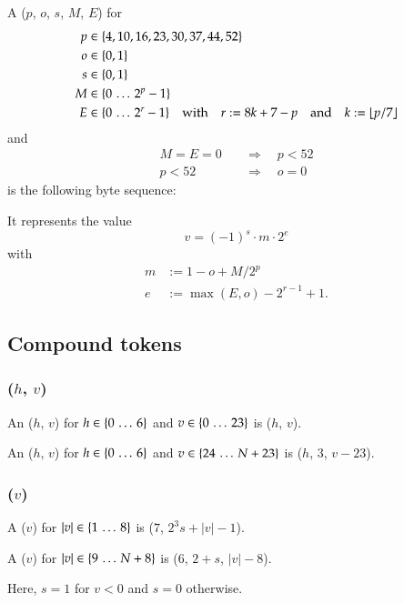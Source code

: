A \DborBinaryRationalToken($p$, $o$, $s$, $M$, $E$) for
\begin{align*}
    p & \in \{4, 10, 16, 23, 30, 37, 44, 52\} \\
    o & \in \{0, 1\} \\
    s & \in \{0, 1\} \\
    M & \in \{0 \,\ldots\, 2^p - 1\} \\
    E & \in \{0 \,\ldots\, 2^r - 1\}
        \quad\text{with}\quad r := 8 k + 7 - p
        \quad\text{and}\quad k := \lfloor p / 7 \rfloor
\end{align*}%
and
\begin{align*}
    M = E = 0 \quad & \Rightarrow \quad p < 52 \\
    p < 52 \quad & \Rightarrow \quad o = 0
\end{align*}%
is the following byte sequence:


It represents the value
\begin{equation}
    v = (-1)^s \cdot m \cdot 2^e
\end{equation}
with
\begin{align*}
    m & := 1 - o + M / 2^p \\
    e & := \max(E, o) - 2^{r-1} + 1.
\end{align*}


\subsection{Compound tokens}

\subsubsection{\DborIntegerToken(\texorpdfstring{$h$, $v$}{h, v})}
\hypertarget{sec:def:IntegerToken}{}

An \DborIntegerToken($h$, $v$) for $h \in \{0 \,\ldots\, 6\}$ and
$v \in \{0 \,\ldots\, 23\}$ is \DborMinimalToken($h$, $v$).

An \DborIntegerToken($h$, $v$) for $h \in \{0 \,\ldots\, 6\}$ and
$v \in \{24 \,\ldots\, N + 23\}$
is \DborNaturalToken($h$, $3$, $v - 23$).


\subsubsection{\DborPowerOfTenToken(\texorpdfstring{$v$}{v})}
\hypertarget{sec:def:PowerOfTenToken}{}

A \DborPowerOfTenToken($v$) for $|v| \in \{1 \,\ldots\, 8\}$ is
\DborMinimalToken($7$, $2^3 s + |v| - 1$).

A \DborPowerOfTenToken($v$) for $|v| \in \{9 \,\ldots\, N + 8\}$ is
\DborNaturalToken($6$, $2 + s$, $|v| - 8$).

Here, $s = 1$ for $v < 0$ and $s = 0$ otherwise.
